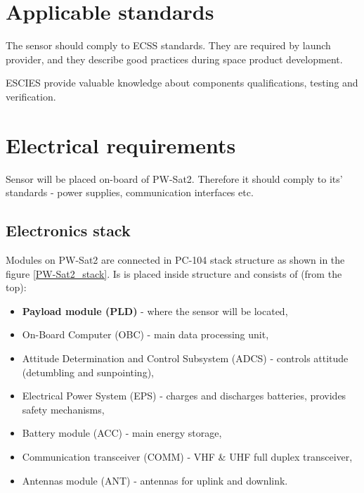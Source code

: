 \section{Applicable standards}
    The sensor should comply to ECSS \cite{ECSS_URL} standards. They are required by launch provider, and they describe good practices during space product development.

    ESCIES \cite{ESCIES_URL} provide valuable knowledge about components qualifications, testing and verification.

\section{Electrical requirements}
    Sensor will be placed on-board of PW-Sat2. Therefore it should comply to its' standards - power supplies, communication interfaces etc.

    \subsection{Electronics stack}
        Modules on PW-Sat2 are connected in PC-104 stack structure as shown in the figure \ref{PW-Sat2_stack}. Is is placed inside structure and consists of (from the top):
        \begin{itemize}
            \item \textbf{Payload module (PLD)} - where the sensor will be located,
            \item On-Board Computer (OBC) - main data processing unit,
            \item Attitude Determination and Control Subsystem (ADCS) - controls attitude (detumbling and sunpointing),
            \item Electrical Power System (EPS) - charges and discharges batteries, provides safety mechanisms,
            \item Battery module (ACC) - main energy storage,
            \item Communication transceiver (COMM) - VHF \& UHF full duplex transceiver,
            \item Antennas module (ANT) - antennas for uplink and downlink.
        \end{itemize}

